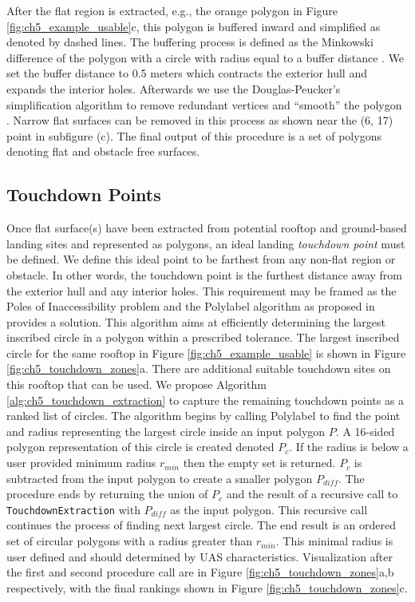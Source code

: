 After the flat region is extracted, e.g., the orange polygon in Figure \ref{fig:ch5_example_usable}c, this polygon is buffered inward and simplified as denoted by dashed lines. The buffering process is defined as the Minkowski difference of the polygon with a circle with radius equal to a buffer distance \cite{agarwal2002polygon}. We set the buffer distance to 0.5 meters which contracts the exterior hull and expands the interior holes.  Afterwards we use the Douglas-Peucker's simplification algorithm to remove redundant vertices and ``smooth'' the polygon \cite{douglas_algorithms_1973}.
Narrow flat surfaces can be removed in this process as shown near the (6, 17) point in subfigure (c). The final output of this procedure is a set of polygons denoting flat and obstacle free surfaces.

\subsection{Touchdown Points}\label{sec:ch5_method_circle}\label{sec:ch5_touchdown}
Once flat surface(s) have been extracted from potential rooftop and ground-based landing sites and represented as polygons, an ideal landing \emph{touchdown point} must be defined. We define this ideal point to be farthest from any non-flat region or obstacle. In other words, the touchdown point is the furthest distance away from the exterior hull and any interior holes. This requirement may be framed as the Poles of Inaccessibility problem \cite{garcia-castellanos_poles_2007} and the Polylabel algorithm as proposed in \cite{noauthor_github_2018-3} provides a solution. This algorithm aims at efficiently determining the largest inscribed circle in a polygon within a prescribed tolerance. The largest inscribed circle for the same rooftop in Figure \ref{fig:ch5_example_usable} is shown in Figure \ref{fig:ch5_touchdown_zones}a. 
There are additional suitable touchdown sites on this rooftop that can be used. We propose Algorithm \ref{alg:ch5_touchdown_extraction} to capture the remaining touchdown points as a ranked list of circles. The algorithm begins by calling Polylabel to find the point and radius representing the largest circle inside an input polygon $P$.  A 16-sided polygon representation of this circle is created denoted $P_c$. If the radius is below a user provided minimum radius $r_{min}$ then the empty set is returned. $P_c$ is subtracted from the input polygon to create a smaller polygon $P_{diff}$. The procedure ends by returning the union of $P_c$ and the result of a recursive call to \texttt{TouchdownExtraction} with $P_{diff}$ as the input polygon. This recursive call continues the process of finding next largest circle. The end result is an ordered set of circular polygons with a radius greater than $r_{min}$. This minimal radius is user defined and should determined by \ac{UAS} characteristics. Visualization after the first and second procedure call are in Figure \ref{fig:ch5_touchdown_zones}a,b respectively, with the final rankings shown in Figure \ref{fig:ch5_touchdown_zones}c.

